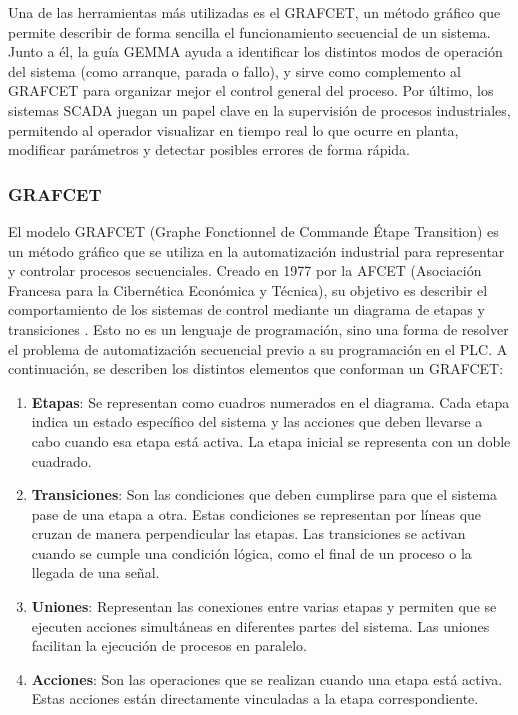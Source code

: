 Una de las herramientas más utilizadas es el GRAFCET, un método gráfico que permite describir de forma sencilla el funcionamiento secuencial de un sistema. Junto a él, la guía GEMMA ayuda a identificar los distintos modos de operación del sistema (como arranque, parada o fallo), y sirve como complemento al GRAFCET para organizar mejor el control general del proceso. Por último, los sistemas SCADA juegan un papel clave en la supervisión de procesos industriales, permitendo al operador visualizar en tiempo real lo que ocurre en planta, modificar parámetros y detectar posibles errores de forma rápida.

\newpage

\subsubsection{GRAFCET}

El modelo GRAFCET (Graphe Fonctionnel de Commande Étape Transition) es un método gráfico que se utiliza en la automatización industrial para representar y controlar procesos secuenciales. Creado en 1977 por la AFCET (Asociación Francesa para la Cibernética Económica y Técnica), su objetivo es describir el comportamiento de los sistemas de control mediante un diagrama de etapas y transiciones \cite{grafcet_info}. Esto no es un lenguaje de programación, sino una forma de resolver el problema de automatización secuencial previo a su programación en el PLC. A continuación, se describen los distintos elementos que conforman un GRAFCET:

\begin{enumerate}
    \item \textbf{Etapas}: Se representan como cuadros numerados en el diagrama. Cada etapa indica un estado específico del sistema y las acciones que deben llevarse a cabo cuando esa etapa está activa. La etapa inicial se representa con un doble cuadrado.
    \item \textbf{Transiciones}: Son las condiciones que deben cumplirse para que el sistema pase de una etapa a otra. Estas condiciones se representan por líneas que cruzan de manera perpendicular las etapas. Las transiciones se activan cuando se cumple una condición lógica, como el final de un proceso o la llegada de una señal.
    \item \textbf{Uniones}: Representan las conexiones entre varias etapas y permiten que se ejecuten acciones simultáneas en diferentes partes del sistema. Las uniones facilitan la ejecución de procesos en paralelo.
    \item \textbf{Acciones}: Son las operaciones que se realizan cuando una etapa está activa. Estas acciones están directamente vinculadas a la etapa correspondiente.
\end{enumerate}
    
